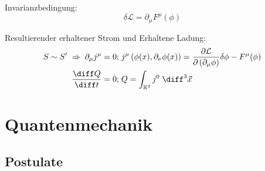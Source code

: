 \documentclass[11pt]{article}
\numberwithin{equation}{section}
\begin{document}
      Invarianzbedingung:
      \begin{equation}
        \delta\mathcal{L} = \partial_\mu F^\mu(\phi)
      \end{equation}

      Resultierender erhaltener Strom und Erhaltene Ladung:
      \begin{equation}
        \begin{aligned}
          S \sim S' \;\Rightarrow\;\partial_\mu j^\mu = 0;&\; j^\mu \left( \phi(x), \partial_\nu\phi(x) \right) = \pder{\mathcal{L}}{\left(\partial_\mu \phi\right)}\delta\phi - F^\mu(\phi) \\
          \tder{Q}{t} = 0;&\; Q = \int_{\mathbb{R}^3} j^0\;\diff^3\vec{x}
        \end{aligned}
      \end{equation}



  \newpage
	\section{Quantenmechanik}
    \subsection{Postulate}
\end{document}
